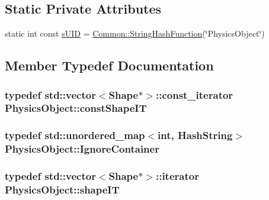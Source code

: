 \subsection*{Static Private Attributes}
\begin{DoxyCompactItemize}
\item 
static int const \hyperlink{classPhysicsObject_ae53856b261838ff637770c08450305b1}{s\+U\+ID} = \hyperlink{namespaceCommon_a994c43a8ea7b03968186a635687a6521}{Common\+::\+String\+Hash\+Function}(\char`\"{}Physics\+Object\char`\"{})
\end{DoxyCompactItemize}


\subsection{Member Typedef Documentation}
\subsubsection[{\texorpdfstring{const\+Shape\+IT}{constShapeIT}}]{\setlength{\rightskip}{0pt plus 5cm}typedef std\+::vector$<${\bf Shape}$\ast$$>$\+::const\+\_\+iterator {\bf Physics\+Object\+::const\+Shape\+IT}}\hypertarget{classPhysicsObject_a8e53564bc32ea9ba2d306d6113dab6e7}{}\label{classPhysicsObject_a8e53564bc32ea9ba2d306d6113dab6e7}
\subsubsection[{\texorpdfstring{Ignore\+Container}{IgnoreContainer}}]{\setlength{\rightskip}{0pt plus 5cm}typedef std\+::unordered\+\_\+map$<$int, {\bf Hash\+String}$>$ {\bf Physics\+Object\+::\+Ignore\+Container}}\hypertarget{classPhysicsObject_a5ab17c11089e18df5c34651dbad8903a}{}\label{classPhysicsObject_a5ab17c11089e18df5c34651dbad8903a}
\subsubsection[{\texorpdfstring{shape\+IT}{shapeIT}}]{\setlength{\rightskip}{0pt plus 5cm}typedef std\+::vector$<${\bf Shape}$\ast$$>$\+::iterator {\bf Physics\+Object\+::shape\+IT}}\hypertarget{classPhysicsObject_aafe647b799f851abde90d86fd19385a2}{}\label{classPhysicsObject_aafe647b799f851abde90d86fd19385a2}


